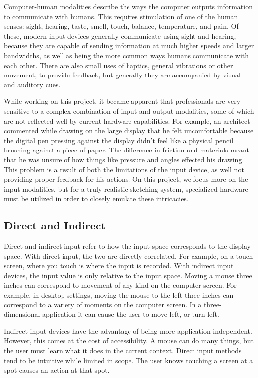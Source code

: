 Computer-human modalities describe the ways the computer outputs information to communicate with humans.
This requires stimulation of one of the human senses: sight, hearing, taste, smell, touch, balance, temperature, and pain. 
Of these, modern input devices generally communicate using sight and hearing, because they are capable of sending information at much higher speeds and larger bandwidths, as well as being the more common ways humans communicate with each other.
There are also small uses of haptics, general vibrations or other movement, to provide feedback, but generally they are accompanied by visual and auditory cues.

While working on this project, it became apparent that professionals are very sensitive to a complex combination of input and output modalities, some of which are not reflected well by current hardware capabilities. 
For example, an architect commented while drawing on the large display that he felt uncomfortable because the digital pen pressing against the display didn't feel like a physical pencil brushing against a piece of paper. 
The difference in friction and materials meant that he was unsure of how things like pressure and angles effected his drawing.
This problem is a result of both the limitations of the input device, as well not providing proper feedback for his actions.
On this project, we focus more on the input modalities, but for a truly realistic sketching system, specialized hardware must be utilized in order to closely emulate these intricacies.

\subsection{Direct and Indirect}
Direct and indirect input refer to how the input space corresponds to the display space. 
With direct input, the two are directly correlated. 
For example, on a touch screen, where you touch is where the input is recorded. 
With indirect input devices, the input value is only relative to the input space. Moving a mouse three inches can correspond to movement of any kind on the computer screen. 
For example, in desktop settings, moving the mouse to the left three inches can correspond to a variety of moments on the computer screen. 
In a three-dimensional application it can cause the user to move left, or turn left.

Indirect input devices have the advantage of being more application independent. However, this comes at the cost of accessibility. 
A mouse can do many things, but the user must learn what it does in the current context. 
Direct input methods tend to be intuitive while limited in scope. 
The user knows touching a screen at a spot causes an action at that spot.

